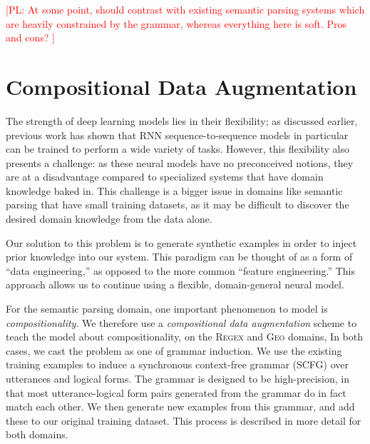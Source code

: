 \documentclass[11pt,letterpaper]{article}
\newcommand{\regex}{\textsc{Regex}\xspace}
\newcommand{\geo}{\textsc{Geo}\xspace}
\newcommand\pl[1]{\textcolor{red}{[PL: #1]}}
\begin{document}
\pl{
  At some point, should contrast with existing semantic parsing systems
  which are heavily constrained by the grammar, whereas everything here is soft.
  Pros and cons?
}

\section{Compositional Data Augmentation}
The strength of deep learning models lies in their flexibility;
as discussed earlier, previous work has shown that
RNN sequence-to-sequence models in particular can be trained
to perform a wide variety of tasks.  
However, this flexibility also presents a challenge:
as these neural models have no preconceived notions,
they are at a disadvantage compared to specialized systems
that have domain knowledge baked in.
This challenge is a bigger issue in domains like semantic parsing
that have small training datasets, as
it may be difficult to discover the desired domain knowledge
from the data alone.

Our solution to this problem is to generate synthetic examples
in order to inject prior knowledge into our system.
This paradigm can be thought of as a form of ``data engineering,''
as opposed to the more common ``feature engineering.''
This approach allows us to continue using
a flexible, domain-general neural model.

For the semantic parsing domain, one important phenomenon
to model is \emph{compositionality}.
We therefore use a \emph{compositional data augmentation} scheme
to teach the model about compositionality, on the \regex and \geo domains,
In both cases, we cast the problem as one of grammar induction.
We use the existing training examples to induce a
synchronous context-free grammar (SCFG) over utterances and logical forms.
The grammar is designed to be high-precision, 
in that most utterance-logical form pairs generated from the grammar
do in fact match each other.
We then generate new examples from this grammar,
and add these to our original training dataset.
This process is described in more detail for both domains.

\end{document}
